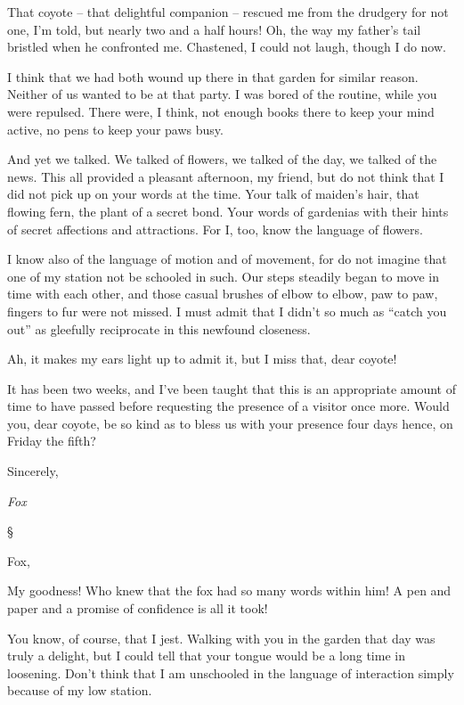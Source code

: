 \documentclass[12pt,letterpaper,oneside]{memoir}
\newcommand\secdiv{
  \begin{center}
    \S
  \end{center}
}
\begin{document}
  That coyote -- that delightful companion -- rescued me from the drudgery
  for not one, I'm told, but nearly two and a half hours! Oh, the way my
  father's tail bristled when he confronted me. Chastened, I could not
  laugh, though I do now.

  I think that we had both wound up there in that garden for similar
  reason. Neither of us wanted to be at that party. I was bored of the
  routine, while you were repulsed. There were, I think, not enough books
  there to keep your mind active, no pens to keep your paws busy.

  And yet we talked. We talked of flowers, we talked of the day, we talked
  of the news. This all provided a pleasant afternoon, my friend, but do
  not think that I did not pick up on your words at the time. Your talk of
  maiden's hair, that flowing fern, the plant of a secret bond. Your words
  of gardenias with their hints of secret affections and attractions. For
  I, too, know the language of flowers.

  I know also of the language of motion and of movement, for do not
  imagine that one of my station not be schooled in such. Our steps
  steadily began to move in time with each other, and those casual brushes
  of elbow to elbow, paw to paw, fingers to fur were not missed. I must
  admit that I didn't so much as ``catch you out'' as gleefully
  reciprocate in this newfound closeness.

  Ah, it makes my ears light up to admit it, but I miss that, dear coyote!

  It has been two weeks, and I've been taught that this is an appropriate
  amount of time to have passed before requesting the presence of a
  visitor once more. Would you, dear coyote, be so kind as to bless us
  with your presence four days hence, on Friday the fifth?

  Sincerely,

  \emph{Fox}

  \secdiv

  Fox,

  My goodness! Who knew that the fox had so many words within him! A pen
  and paper and a promise of confidence is all it took!

  You know, of course, that I jest. Walking with you in the garden that
  day was truly a delight, but I could tell that your tongue would be a
  long time in loosening. Don't think that I am unschooled in the language
  of interaction simply because of my low station.
\end{document}
